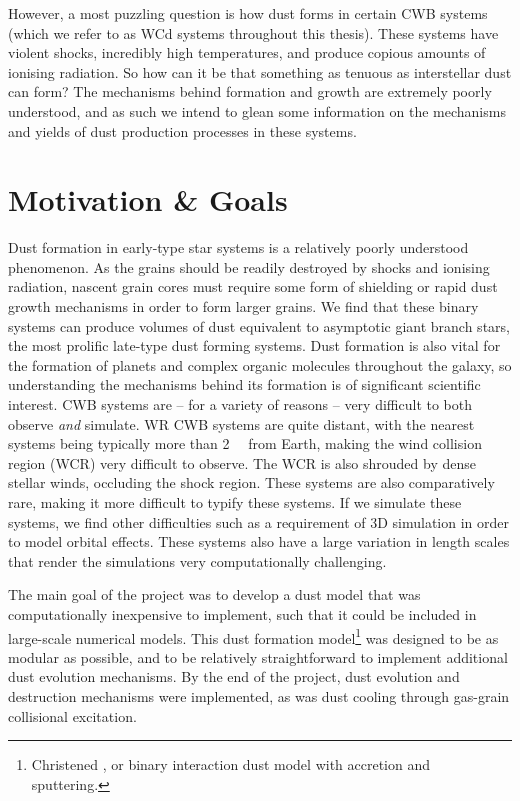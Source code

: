 However, a most puzzling question is how dust forms in certain CWB systems (which we refer to as WCd systems throughout this thesis).
These systems have violent shocks, incredibly high temperatures, and produce copious amounts of ionising radiation.
So how can it be that something as tenuous as interstellar dust can form?
The mechanisms behind formation and growth are extremely poorly understood, and as such we intend to glean some information on the mechanisms and yields of dust production processes in these systems.

\section{Motivation \& Goals}
\label{sec:projectgoals}

Dust formation in early-type star systems is a relatively poorly understood phenomenon.
As the grains should be readily destroyed by shocks and ionising radiation, nascent grain cores must require some form of shielding or rapid dust growth mechanisms in order to form larger grains.
We find that these binary systems can produce volumes of dust equivalent to asymptotic giant branch stars, the most prolific late-type dust forming systems.
Dust formation is also vital for the formation of planets and complex organic molecules throughout the galaxy, so understanding the mechanisms behind its formation is of significant scientific interest.
CWB systems are -- for a variety of reasons -- very difficult to both observe \emph{and} simulate.
WR CWB systems are quite distant, with the nearest systems being typically more than \SI{2}{\kilo\parsec} from Earth, making the wind collision region (WCR) very difficult to observe.
The WCR is also shrouded by dense stellar winds, occluding the shock region.
These systems are also comparatively rare, making it more difficult to typify these systems.
If we simulate these systems, we find other difficulties such as a requirement of 3D simulation in order to model orbital effects.
These systems also have a large variation in length scales that render the simulations very computationally challenging.

The main goal of the project was to develop a dust model that was computationally inexpensive to implement, such that it could be included in large-scale numerical models.
This dust formation model\footnote{Christened \bidmas{}, or binary interaction dust model with accretion and sputtering.} was designed to be as modular as possible, and to be relatively straightforward to implement additional dust evolution mechanisms.
By the end of the project, dust evolution and destruction mechanisms were implemented, as was dust cooling through gas-grain collisional excitation.

